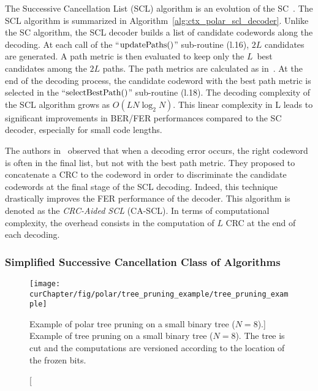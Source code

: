 The Successive Cancellation List (SCL) algorithm is an evolution of the
SC~\cite{Tal2011}. The SCL algorithm is summarized in
Algorithm~\ref{alg:ctx_polar_scl_decoder}. Unlike the SC algorithm, the SCL
decoder builds a list of candidate codewords along the decoding. At each call of
the ``$\operatorname*{updatePaths}()$'' sub-routine (l.16), $2L$ candidates are generated. A
path metric is then evaluated to keep only the $L$~best candidates among the
$2L$ paths. The path metrics are calculated as
in~\cite{Balatsoukas-Stimming2015}. At the end of the decoding process, the
candidate codeword with the best path metric is selected in the
``$\operatorname*{selectBestPath}()$'' sub-routine (l.18). The decoding complexity of the
SCL algorithm grows as $O(LN\log_2N)$. This linear complexity in L leads to
significant improvements in BER/FER performances compared to the SC decoder,
especially for small code lengths.


The authors in~\cite{Tal2011} observed that when a decoding error occurs, the
right codeword is often in the final list, but not with the best path metric.
They proposed to concatenate a CRC to the codeword in order to discriminate the
candidate codewords at the final stage of the SCL decoding. Indeed, this
technique drastically improves the FER performance of the decoder. This
algorithm is denoted as the \emph{CRC-Aided SCL} (CA-SCL). In terms of
computational complexity, the overhead consists in the computation of $L$ CRC at
the end of each decoding.

\subsubsection{Simplified Successive Cancellation Class of Algorithms}
\label{sec:ctx_polar_simplified_decoders}

\begin{figure}[htp]
  \centering
  \texttt{[image: \\curChapter/fig/polar/tree\_pruning\_example/tree\_pruning\_example]}
  \caption
    [Example of polar tree pruning on a small binary tree ($N = 8$).]
    {Example of tree pruning on a small binary tree ($N = 8$). The tree is cut
    and the computations are versioned according to the location of the frozen
    bits.}
  \label{fig:ctx_polar_tree_pruning_example}
\end{figure}

